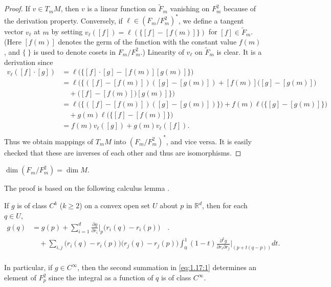 \begin{proof}
	If $v \in T_{m} M$, then $v$ is a linear function on $\widetilde{F}_m$
	vanishing on $F_m^2$ because of the derivation property.
	Conversely, if $\ell \in (F_m/F_m^2)^*$, we define a tangent
	vector $v_\ell$ at $m$ by setting
	$v_\ell([f]) = \ell(\{[f] - [f(m)]\})$
	for $[f] \in \widetilde{F}_m$. (Here $[f(m)]$
	denotes the germ of the function with the constant value $f(m)$,
	and $\{\ \}$ is used to denote cosets in $F_m/F_m^2$.)
	Linearity of $v_\ell$ on $\widetilde{F}_m$ is clear. It is a derivation since
	\[
		\begin{aligned}{v_{\ell}([f]\cdot[g])}&{{}=\ell\big(\{[f]\cdot[g]-[f(m)][g(m)]\}\big)}\\ {}&{{}=\ell\big(\{([f]-[f(m)])([g]-[g(m)])+[f(m)]\big([g]-[g(m)]\big)}\\ {}&{{}\quad+\big([f]-[f(m)]\big)[g(m)]\}\big)}\\ {}&{{}=\ell\big(\{([f]-[f(m)])([g]-[g(m)])\}\big)+f(m)\ell\big(\{[g]-[g(m)]\}\big)}\\ {}&{{}\quad+g(m)\ell\big(\{[f]-[f(m)]\}\big)}\\ {}&{{}=f(m)v_{\ell}([g])+g(m)v_{\ell}([f]).}\\ \end{aligned}
	\]
	Thus we obtain mappings of $T_{m} M$ into $(F_{m}/F_{m}^{2})^{*}$,
	and vice versa. It is easily checked that these are inverses
	of each other and thus are isomorphisms.
\end{proof}

\begin{theorem}\label{thm:1.17}
	$\dim\left(F_{m}/F_{m}^{2}\right)=\dim M.$
\end{theorem}

The proof is based on the following calculus lemma \cite{31}.

\begin{lemma*}
	If $g$ is of class $C^k$ ($k \geq 2$) on a convex open set $U$ about $p$ in $\mathbb{R}^d$, then for each $q \in U$,
	\begin{equation}
		\tag{1}\label{eq:1.17:1}
		\begin{aligned}{g(q)} & {{}=g(p)+\sum_{i=1}^{d}\frac{\partial g}{\partial r_{i}}\bigg|_{p}\big(r_{i}(q)-r_{i}(p)\big)\quad.} \\
		               {}     & {{}\quad+\sum_{i,j}\big(r_{i}(q)-r_{i}(p)\big)\big(r_{j}(q)-r_{j}(p)\big)
			                        \int_{0}^{1}(1-t)\frac{\partial^{2}g}{\partial r_{i}\partial r_{j}}\bigg|_{(p+t(q-p))}d t.}         \\
		\end{aligned}
	\end{equation}
\end{lemma*}
In particular, if $g \in C^{\infty}$, then the second summation in \eqref{eq:1.17:1}
determines an element of $F_{p}^{2}$ since the integral as a function of $q$ is of class $C^{\infty}$.

